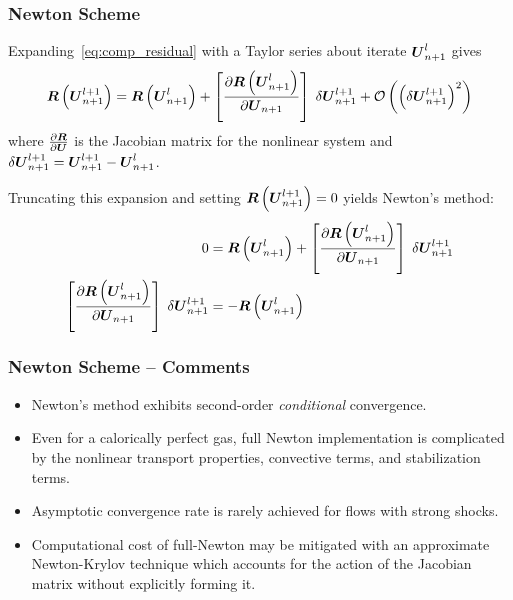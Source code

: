 \documentclass[compress,11pt]{beamer}
\begin{document}
\frame
{
  \frametitle{\scriptsize Newton Scheme}
  \vspace{-1em}
  \footnotesize
  Expanding~\eqref{eq:comp_residual} with a Taylor series about iterate ${\boldsymbol{U}}_{n+1}^l$ gives
  \begin{equation}
    \label{eq:comp_residual_linearized}  
    {\boldsymbol{R}}\left({\boldsymbol{U}}_{n+1}^{l+1}\right) = {\boldsymbol{R}}\left({\boldsymbol{U}}_{n+1}^l\right) +\left[{\frac{\partial{{\boldsymbol{R}}\left({\boldsymbol{U}}_{n+1}^l\right)}}{\partial{{\boldsymbol{U}}_{n+1}}}}\right]\;\delta{\boldsymbol{U}}_{n+1}^{l+1} + \mathcal{O}\left(\left(\delta{\boldsymbol{U}}_{n+1}^{l+1}\right)^2\right)
  \end{equation}
  where ${\frac{\partial{{\boldsymbol{R}}}}{\partial{{\boldsymbol{U}}}}}$ is the Jacobian matrix for the nonlinear system and $\delta {\boldsymbol{U}}_{n+1}^{l+1}={\boldsymbol{U}}_{n+1}^{l+1}-{\boldsymbol{U}}_{n+1}^l$.
  \vspace{1em}
  
  {
    Truncating this expansion and setting ${\boldsymbol{R}}\left({\boldsymbol{U}}_{n+1}^{l+1}\right)=0$ yields Newton's method:
    \begin{align}
      0 &= {\boldsymbol{R}}\left({\boldsymbol{U}}_{n+1}^l\right) + \left[{\frac{\partial{{\boldsymbol{R}}\left({\boldsymbol{U}}_{n+1}^l\right)}}{\partial{{\boldsymbol{U}}_{n+1}}}}\right]\;\delta{\boldsymbol{U}}_{n+1}^{l+1} \nonumber \\
      \left[{\frac{\partial{{\boldsymbol{R}}\left({\boldsymbol{U}}_{n+1}^l\right)}}{\partial{{\boldsymbol{U}}_{n+1}}}}\right]\;\delta{\boldsymbol{U}}_{n+1}^{l+1} &= -{\boldsymbol{R}}\left({\boldsymbol{U}}_{n+1}^l\right) \label{eq:comp_newton_system}
    \end{align}
  }
}

\frame
{
  \frametitle{\scriptsize Newton Scheme -- Comments}
  \vspace{-.5em}
  
  \begin{itemize}
    \item Newton's method exhibits second-order \emph{conditional} convergence.
    \item Even for a calorically perfect gas, full Newton implementation is complicated by the nonlinear transport properties, convective terms, and stabilization terms.
    \item Asymptotic convergence rate is rarely achieved for flows with strong shocks.
    \item Computational cost of full-Newton may be mitigated with an approximate Newton-Krylov technique which accounts for the action of the Jacobian matrix without explicitly forming it.
  \end{itemize}
}
\end{document}
